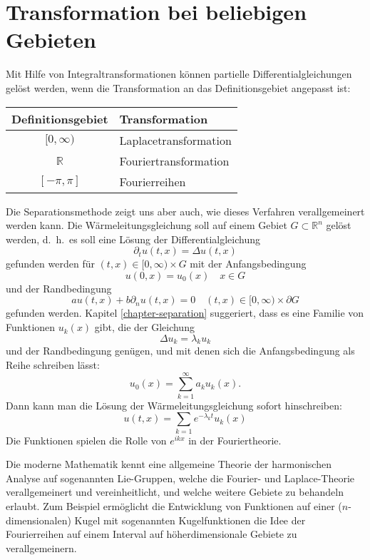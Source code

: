%
%
%
\section{Transformation bei beliebigen Gebieten}
Mit Hilfe von Integraltransformationen können partielle
Differentialgleichungen  gelöst werden, wenn die Transformation
an das Definitionsgebiet angepasst ist:
\begin{center}
\begin{tabular}{cl}
Definitionsgebiet&Transformation\\
\hline
$[0,\infty)$&Laplacetransformation\\
$\mathbb R$&Fouriertransformation\\
$[-\pi,\pi]$&Fourierreihen
\end{tabular}
\end{center}
Die Separationsmethode zeigt uns aber auch, wie dieses 
Verfahren verallgemeinert werden kann. Die Wärmeleitungsgleichung
soll auf einem Gebiet $G\subset \mathbb R^n$ gelöst werden, d.~h.~es
soll eine Lösung der Differentialgleichung
\[
\partial_t u(t,x)=\Delta u(t,x)
\]
gefunden werden für $(t,x)\in [0,\infty)\times G$ mit der Anfangsbedingung
\[
u(0,x)=u_0(x) \quad x\in G
\]
und der Randbedingung
\[
au(t,x)+b\partial_nu(t,x)=0\quad (t,x)\in[0,\infty)\times \partial G
\]
gefunden werden. Kapitel \ref{chapter-separation} suggeriert, dass
es eine Familie von Funktionen $u_k(x)$ gibt, die der Gleichung
\[
\Delta u_k=\lambda_k u_k
\]
und der Randbedingung genügen, und mit denen sich die 
Anfangsbedingung als Reihe schreiben lässt:
\[
u_0(x)=\sum_{k=1}^\infty a_ku_k(x).
\]
Dann kann man die Lösung der Wärmeleitungsgleichung sofort
hinschreiben:
\[
u(t,x)=\sum_{k=1}e^{-\lambda_kt}u_k(x)
\]
Die Funktionen spielen die Rolle von $e^{ikx}$ in der Fouriertheorie.

Die moderne Mathematik kennt eine allgemeine Theorie der harmonischen
Analyse auf sogenannten Lie-Gruppen, welche die Fourier- und 
Laplace-Theorie verallgemeinert und vereinheitlicht, und welche
weitere Gebiete zu behandeln erlaubt. Zum Beispiel ermöglicht
die Entwicklung von Funktionen auf einer ($n$-dimensionalen)
Kugel mit sogenannten Kugelfunktionen die Idee der Fourierreihen
auf einem Interval auf höherdimensionale Gebiete zu verallgemeinern.


